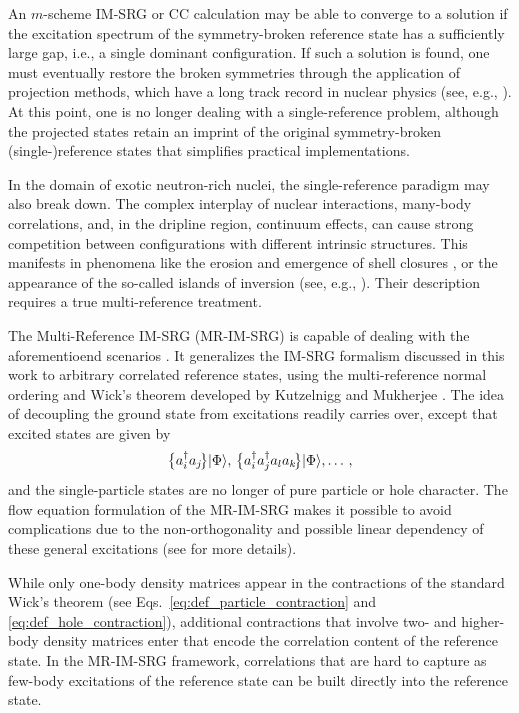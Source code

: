 An $m$-scheme IM-SRG or CC calculation may be able to converge to a
solution if the excitation spectrum of the symmetry-broken reference
state has a sufficiently large gap, i.e., a single dominant
configuration. If such a solution is found, one must eventually
restore the broken symmetries through the application of projection
methods, which have a long track record in nuclear physics (see, e.g.,
\cite{Peierls:1973fk,Ring:1980bb,Egido:1982sd,Robledo:1994qf,Flocard:1997fx,Sheikh:2000xx,Dobaczewski:2007hh,Bender:2009rv,Duguet:2009ph,Lacroix:2009aj,Lacroix:2012vn,Duguet:2015ye}). At
this point, one is no longer dealing with a single-reference problem,
although the projected states retain an imprint of the original
symmetry-broken (single-)reference states that simplifies practical
implementations.

In the domain of exotic neutron-rich nuclei, the single-reference
paradigm may also break down. The complex interplay of nuclear
interactions, many-body correlations, and, in the dripline region,
continuum effects, can cause strong competition between configurations
with different intrinsic structures. This manifests in phenomena like
the erosion and emergence of shell closures
\cite{Wienholtz:2013bh,Holt:2014vn,Soma:2014eu,Hergert:2014vn}, or the
appearance of the so-called islands of inversion (see, e.g.,
\cite{Brown:2010xr}). Their description requires a true
multi-reference treatment.

The Multi-Reference IM-SRG (MR-IM-SRG) is capable of dealing with the
aforementioend scenarios
\cite{Hergert:2013ij,Hergert:2014vn,Hergert:2015qd}. It generalizes
the IM-SRG formalism discussed in this work to arbitrary correlated
reference states, using the multi-reference normal ordering and Wick's
theorem developed by Kutzelnigg and Mukherjee
\cite{Kutzelnigg:1997fk,Mukherjee:1997yg}. The idea of decoupling the
ground state from excitations readily carries over, except that
excited states are given by
\begin{equation*}
\big\{a^\dag_ia_j\!\big\}\!\,|{\Phi}\rangle,\,\big\{a^\dag_ia^\dag_ja_la_k\!\big\}\!\,|{\Phi}\rangle,\ldots\,,
\end{equation*}
and the single-particle states are no longer of pure particle or hole
character.  The flow equation formulation of the MR-IM-SRG makes it
possible to avoid complications due to the non-orthogonality and
possible linear dependency of these general excitations (see
\cite{Hergert:2015qd} for more details).

While only one-body density matrices appear in the contractions of the
standard Wick's theorem (see Eqs.~\eqref{eq:def_particle_contraction}
and \eqref{eq:def_hole_contraction}), additional contractions that
involve two- and higher-body density matrices enter that encode the
correlation content of the reference state. In the MR-IM-SRG
framework, correlations that are hard to capture as few-body
excitations of the reference state can be built directly into the
reference state.

